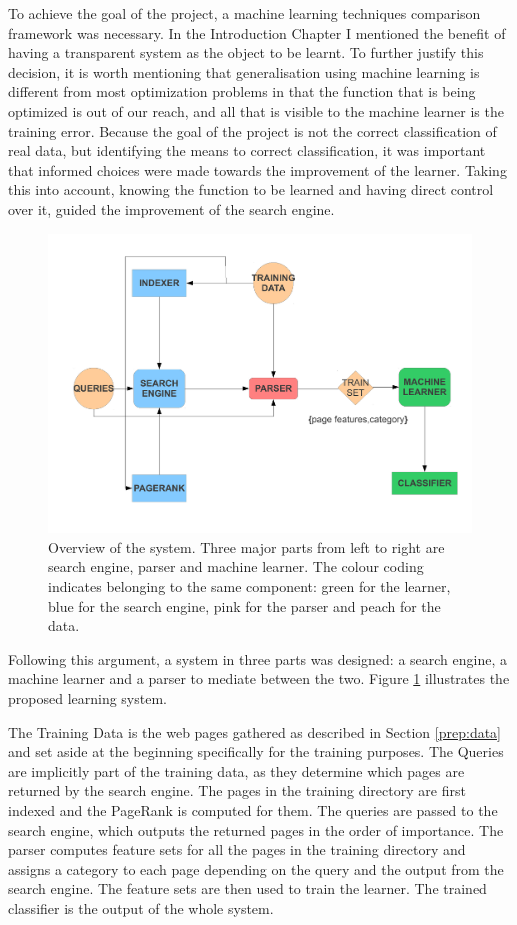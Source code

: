 \documentclass[12pt,notitlepage,twoside]{scrreprt}
\begin{document}
To achieve the goal of the project, a machine learning techniques comparison framework was
necessary. In the Introduction Chapter I mentioned the benefit of having a transparent
system as the object to be learnt. To further justify this decision, it is worth mentioning
that generalisation using machine learning is different from most optimization problems in
that the function that is being optimized is out of our reach, and all that is visible to
the machine learner is the training error. Because the goal of the project is not the
correct classification of real data, but identifying the means to correct classification,
it was important that informed choices were made towards the improvement of the learner.
Taking this into account, knowing the function to be learned and having direct control
over it, guided the improvement of the search engine. 
\begin{figure}[h!]
\centering
\includegraphics[width=\textwidth]{figs/overview.pdf}
\caption{Overview of the system. Three major parts from left to right are search engine,
parser and machine learner. The colour coding indicates belonging to the same component:
green for the learner, blue for the search engine, pink for the parser and peach for the
data.\label{overview}}
\end{figure}

Following this argument, a system in three parts was designed: a search engine, a machine
learner and a parser to mediate between the two. Figure \ref{overview} illustrates the
proposed learning system.

The Training Data is the web pages gathered as described in Section \ref{prep:data} and
set aside at the beginning specifically for the training purposes. The Queries are
implicitly part of the training data, as they determine which pages are returned by the
search engine. The pages in the training directory are first indexed and the PageRank is
computed for them. The queries are passed to the search engine, which outputs the returned
pages in the order of importance. The parser computes feature sets for all the pages in
the training directory and assigns a category to each page depending on the query and the
output from the search engine. The feature sets are then used to train the learner. The
trained classifier is the output of the whole system.
\end{document}
